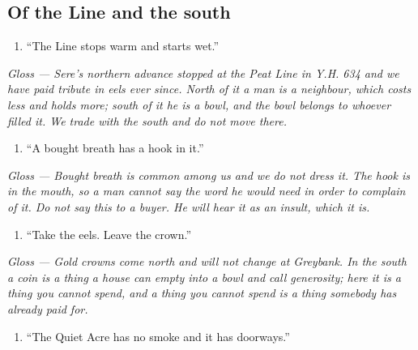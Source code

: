 \documentclass{design/chronicle}
\begin{document}
\subsection*{Of the Line and the south}

\begin{enumerate}[leftmargin=1.4em,itemsep=1pt,topsep=3pt,parsep=0pt]

\item “The Line stops warm and starts wet.”

\end{enumerate}

\emph{Gloss — Sere’s northern advance stopped at the Peat Line in Y.H. 634 and we have paid tribute in eels ever since. North of it a man is a neighbour, which costs less and holds more; south of it he is a bowl, and the bowl belongs to whoever filled it. We trade with the south and do not move there.}

\begin{enumerate}[leftmargin=1.4em,itemsep=1pt,topsep=3pt,parsep=0pt]

\item “A bought breath has a hook in it.”

\end{enumerate}

\emph{Gloss — Bought breath is common among us and we do not dress it. The hook is in the mouth, so a man cannot say the word he would need in order to complain of it. Do not say this to a buyer. He will hear it as an insult, which it is.}

\begin{enumerate}[leftmargin=1.4em,itemsep=1pt,topsep=3pt,parsep=0pt]

\item “Take the eels. Leave the crown.”

\end{enumerate}

\emph{Gloss — Gold crowns come north and will not change at Greybank. In the south a coin is a thing a house can empty into a bowl and call generosity; here it is a thing you cannot spend, and a thing you cannot spend is a thing somebody has already paid for.}

\begin{enumerate}[leftmargin=1.4em,itemsep=1pt,topsep=3pt,parsep=0pt]

\item “The Quiet Acre has no smoke and it has doorways.”

\end{enumerate}
\end{document}
